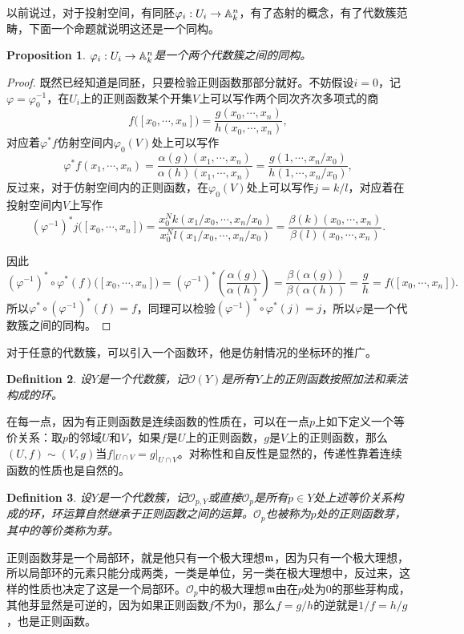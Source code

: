 \documentclass[9pt]{extbook}
\theoremstyle{plain}%
\newtheorem{defi}{Definition}[section]%
\newtheorem{pro}[defi]{Proposition}%
\begin{document}
以前说过，对于投射空间，有同胚$\varphi_i:U_i\to \mathbb{A}^n_k$，有了态射的概念，有了代数簇范畴，下面一个命题就说明这还是一个同构。
\begin{pro}
	$\varphi_i:U_i\to \mathbb{A}^n_k$是一个两个代数簇之间的同构。
	\label{c3:p1}
\end{pro}
\begin{proof}
	既然已经知道是同胚，只要检验正则函数那部分就好。不妨假设$i=0$，记$\varphi=\varphi_0^{-1}$，在$U_i$上的正则函数某个开集$V$上可以写作两个同次齐次多项式的商
	\[
		f\bigl([x_0,\cdots,x_n]\bigr)=\frac{g(x_0,\cdots,x_n)}{h(x_0,\cdots,x_n)},
	\]
	对应着$\varphi^*f$仿射空间内$\varphi_0(V)$处上可以写作
	\[
		\varphi^*f(x_1,\cdots,x_n)=\frac{\alpha(g)(x_1,\cdots,x_n)}{\alpha(h)(x_1,\cdots,x_n)}=\frac{g(1,\cdots,x_n/x_0)}{h(1,\cdots,x_n/x_0)},
	\]
	反过来，对于仿射空间内的正则函数，在$\varphi_0(V)$处上可以写作$j=k/l$，对应着在投射空间内$V$上写作
	\[
		(\varphi^{-1})^*j\bigl([x_0,\cdots,x_n]\bigr)=\frac{x_0^Nk(x_1/x_0,\cdots,x_n/x_0)}{x_0^Nl(x_1/x_0,\cdots,x_n/x_0)}=\frac{\beta(k)(x_0,\cdots,x_n)}{\beta(l)(x_0,\cdots,x_n)}.
	\]

	因此
	\[
		(\varphi^{-1})^*\circ \varphi^*(f) \bigl([x_0,\cdots,x_n]\bigr)=(\varphi^{-1})^*\left(\frac{\alpha(g)}{\alpha(h)}\right)=\frac{\beta(\alpha(g))}{\beta(\alpha(h))}=\frac{g}{h}=f\bigl([x_0,\cdots,x_n]\bigr).
	\]
	所以$\varphi^*\circ(\varphi^{-1})^* (f)=f$，同理可以检验$(\varphi^{-1})^*\circ\varphi^* (j)=j$，所以$\varphi$是一个代数簇之间的同构。
\end{proof}

对于任意的代数簇，可以引入一个函数环，他是仿射情况的坐标环的推广。
\begin{defi}
	设$Y$是一个代数簇，记$\mathcal{O}(Y)$是所有$Y$上的正则函数按照加法和乘法构成的环。
\end{defi}
在每一点，因为有正则函数是连续函数的性质在，可以在一点$p$上如下定义一个等价关系：取$p$的邻域$U$和$V$，如果$f$是$U$上的正则函数，$g$是$V$上的正则函数，那么$(U,f)\sim (V,g)$当$f|_{U\cap V}=g|_{U\cap V}$。对称性和自反性是显然的，传递性靠着连续函数的性质也是自然的。
\begin{defi}
	设$Y$是一个代数簇，记$\mathcal{O}_{p,Y}$或直接$\mathcal{O}_{p}$是所有$p\in Y$处上述等价关系构成的环，环运算自然继承于正则函数之间的运算。$\mathcal{O}_{p}$也被称为$p$处的正则函数芽，其中的等价类称为芽。
\end{defi}
正则函数芽是一个局部环，就是他只有一个极大理想$\mathfrak{m}$，因为只有一个极大理想，所以局部环的元素只能分成两类，一类是单位，另一类在极大理想中，反过来，这样的性质也决定了这是一个局部环。$\mathcal{O}_{p}$中的极大理想$\mathfrak{m}$由在$p$处为$0$的那些芽构成，其他芽显然是可逆的，因为如果正则函数$f$不为0，那么$f=g/h$的逆就是$1/f=h/g$，也是正则函数。
\end{document}
